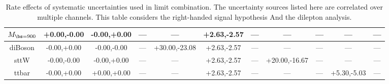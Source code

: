 \begin{table}
\begin{center}
\begin{small}
{\begin{tabular}{|c||cccccccccc|}
\hline 
$M_{\bs=900}$ & +0.00,-0.00 & -0.00,+0.00 & --- & --- & +2.63,-2.57 & --- & --- & --- & --- & ---\\ 
\hline 
diBoson & -0.00,+0.00 & -0.00,-0.00 & --- & +30.00,-23.08 & +2.63,-2.57 & --- & --- & --- & --- & ---\\ 
\hline 
sttW & -0.00,-0.00 & -0.00,+0.00 & --- & --- & +2.63,-2.57 & --- & +20.00,-16.67 & --- & --- & ---\\ 
\hline 
ttbar & -0.00,+0.00 & +0.00,+0.00 & --- & --- & +2.63,-2.57 & --- & --- & --- & +5.30,-5.03 & ---\\ 
\hline
\end{tabular}
}
\caption{Rate effects of systematic uncertainties used in limit combination.  The uncertainty sources listed here are correlated over multiple channels.  This table considers the right-handed signal hypothesis
And the dilepton analysis.}
\label{table:bsRsysCoD}

\end{small}
\end{center}
\end{table}




